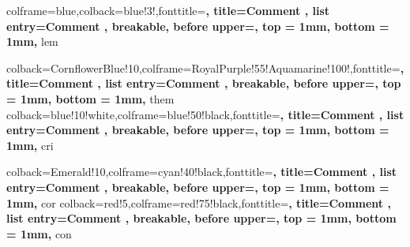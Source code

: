 {
    colframe=blue,colback=blue!3!,fonttitle=\bfseries, title={Comment \thetcbcounter}, list entry={Comment \thetcbcounter\quad}, %
    breakable, %
    before upper={\parindent10pt\noindent},  %
    top = 1mm,%
    bottom = 1mm,%
}
{lem}


{
    colback=CornflowerBlue!10,colframe=RoyalPurple!55!Aquamarine!100!,fonttitle=\bfseries, title={Comment \thetcbcounter}, list entry={Comment \thetcbcounter\quad}, %
    breakable, %
    before upper={\parindent10pt\noindent},  %
    top = 1mm,%
    bottom = 1mm,%
}
{them}
{
    colback=blue!10!white,colframe=blue!50!black,fonttitle=\bfseries, title={Comment \thetcbcounter}, list entry={Comment \thetcbcounter\quad}, %
    breakable, %
    before upper={\parindent10pt\noindent},  %
    top = 1mm,%
    bottom = 1mm,%
}
{cri}

{
    colback=Emerald!10,colframe=cyan!40!black,fonttitle=\bfseries, title={Comment \thetcbcounter}, list entry={Comment \thetcbcounter\quad}, %
    breakable, %
    before upper={\parindent10pt\noindent},  %
    top = 1mm,%
    bottom = 1mm,%
}
{cor}
{
    colback=red!5,colframe=red!75!black,fonttitle=\bfseries, title={Comment \thetcbcounter}, list entry={Comment \thetcbcounter\quad}, %
    breakable, %
    before upper={\parindent10pt\noindent},  %
    top = 1mm,%
    bottom = 1mm,%
}
{con}

